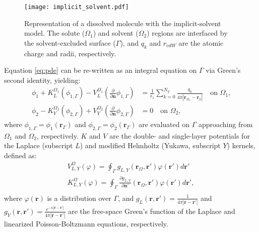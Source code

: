 %
\begin{figure}
\centering
\texttt{[image: implicit\_solvent.pdf]}
\caption{Representation of a dissolved molecule with the implicit-solvent model. The solute ($\Omega_1$) and solvent ($\Omega_2$) regions are interfaced by the solvent-excluded surface ($\Gamma$), and $q_k$ and $r_{vdW}$ are the atomic charge and radii, respectively.}
\label{fig:implicit_solvent}
\end{figure}

Equation \eqref{eq:pde} can be re-written as an integral equation on $\Gamma$ via Green's second identity, yielding:
%
\begin{align} \label{eq:volume_potential}
\phi_{1}+ K_{L}^{\Omega_1}(\phi_{1,\Gamma}) -  V_{L}^{\Omega_1} \left(\frac{\partial}{\partial \mathbf{n}}  \phi_{1,\Gamma}  \right) & = \frac{1}{\epsilon_1} \sum_{k=0}^{N_q}  \frac{q_k}{4\pi|\mathbf{r}_{\Omega_1} - \mathbf{r}_k|}  \quad \text{on $\Omega_1$,} \nonumber \\
\phi_{2} - K_{Y}^{\Omega_2}(\phi_{2,\Gamma}) + V_{Y}^{\Omega_2} \left( \frac{\partial}{\partial \mathbf{n}} \phi_{2,\Gamma} \right) & = 0 \quad \text{on $\Omega_2$,}
\end{align}
%
where $\phi_{1,\Gamma} = \phi_1(\mathbf{r}_\Gamma)$ and $\phi_{2,\Gamma} = \phi_2(\mathbf{r}_\Gamma)$ are evaluated on $\Gamma$ approaching from $\Omega_1$ and $\Omega_2$, respectively. $K$ and $V$ are the double- and single-layer potentials for the Laplace (subscript $L$) and modified Helmholtz (Yukawa, subscript $Y$) kernels, defined as:
%
\begin{align}\label{eq:single_double}
V^\Omega_{L,Y}(\varphi) = \oint_\Gamma g_{L,Y}(\mathbf{r}_\Omega,\mathbf{r}')\varphi(\mathbf{r}')d\mathbf{r}'\nonumber\\
K^\Omega_{L,Y}(\varphi) = \oint_\Gamma \frac{\partial g_{L,Y}}{\partial\mathbf{n}'}(\mathbf{r}_\Omega,\mathbf{r}')\varphi(\mathbf{r}')d\mathbf{r}',\nonumber\\
\end{align}
%
where $\varphi(\mathbf{r})$ is a distribution over $\Gamma$, and $g_L(\mathbf{r},\mathbf{r}')=\frac{1}{4\pi|\mathbf{r}-\mathbf{r}'|}$ and $g_Y(\mathbf{r},\mathbf{r}')=\frac{e^{-\kappa|\mathbf{r}-\mathbf{r}'|}}{4\pi|\mathbf{r}-\mathbf{r}'|}$ are the free-space Green's function of the Laplace and linearized Poisson-Boltzmann equations, respectively. 

